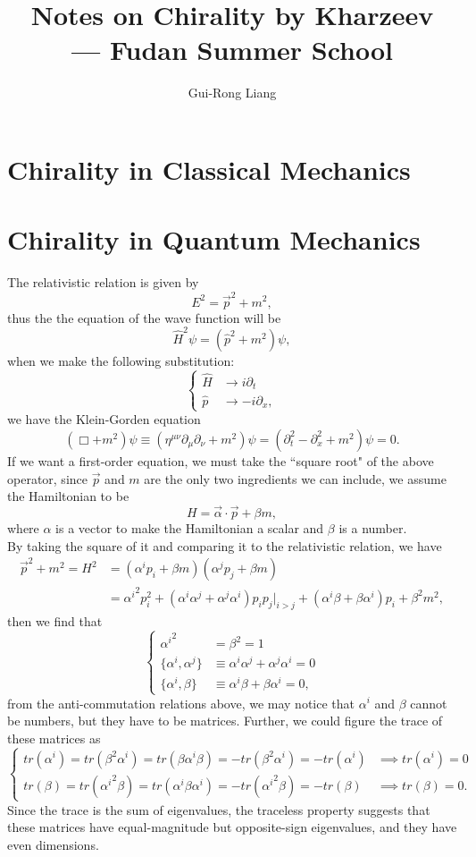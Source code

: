 \documentclass{article}
\title{Notes on Chirality by Kharzeev\\
--- Fudan Summer School}
\author{Gui-Rong Liang}
\newcommand{\be}{\begin{equation}}
\newcommand{\ee}{\end{equation}}
\newcommand{\p}{\partial}
\newcommand{\1}{\left}
\newcommand{\2}{\right}
\newcommand{\m}{\mu}
\newcommand{\n}{\nu}
\newcommand{\al}{\alpha}
\newcommand{\bet}{\beta}
\begin{document}
\maketitle
\tableofcontents

\newpage

\section{Chirality in Classical Mechanics}
\section{Chirality in Quantum Mechanics}
The relativistic relation is given by
\be
E^2=\vec p^2+m^2,
\ee
thus the the equation of the wave function will be 
\be
\hat H^2\psi=(\hat p^2+m^2)\psi,
\ee
when we make the following substitution:
\be\1\{\begin{split}
\hat H &\rightarrow i\p_t\\
\hat p &\rightarrow -i\p_x,
\end{split}\2.\ee
we have the Klein-Gorden equation
\be
(\Box+m^2)\psi\equiv(\eta^{\m\n}\p_\m\p_\n+m^2)\psi=(\p_t^2-\p_x^2+m^2)\psi=0.
\ee
If we want a first-order equation, we must take the ``square root" of the above operator, since $\vec p$ and $m$ are the only two ingredients we can include, we assume the Hamiltonian to be
\be
H=\vec\al\cdot\vec p+\bet m,
\ee
where $\al$ is a vector to make the Hamiltonian a scalar and $\bet$ is a number.\\
By taking the square of it and comparing it to the relativistic relation, we have
\be\begin{split}
\vec p^2+m^2=H^2&=(\al^i p_i+\bet m)(\al^j p_j+\bet m)\\
&={\al^i}^2 p_i^2+(\al^i\al^j+\al^j\al^i)p_i p_j\big|_{i>j}+(\al^i\bet+\bet\al^i)p_i +\bet^2m^2,
\end{split}\ee
then we find that
\be\1\{\begin{split}
{\al^i}^2&=\bet^2=1\\
\{\al^i,\al^j\}&\equiv\al^i\al^j+\al^j\al^i=0\\
\{\al^i,\bet\}&\equiv\al^i\bet+\bet\al^i=0,
\end{split}\2.\ee
from the anti-commutation relations above, we may notice that $\al^i$ and $\bet$ cannot be numbers, but they have to be matrices. Further, we could figure the trace of these matrices as
\be\1\{\begin{split}
tr(\al^i)=tr(\bet^2\al^i)=tr(\bet\al^i\bet)=-tr(\bet^2\al^i)=-tr(\al^i)&\implies tr(\al^i)=0\\
tr(\bet)=tr({\al^i}^2\bet)=tr(\al^i\bet\al^i)=-tr({\al^i}^{2}\bet)=-tr(\bet)&\implies tr(\bet)=0.
\end{split}\2.\ee
Since the trace is the sum of eigenvalues, the traceless property suggests that these matrices have equal-magnitude but opposite-sign eigenvalues, and they have even dimensions.\\
\end{document}
